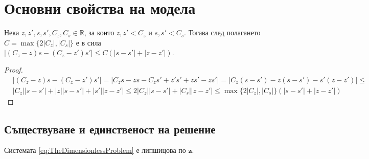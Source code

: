 \section{\hspace{1em} Основни свойства на модела}
\begin{lemma}
  \label{lemma:Modulus}
  Нека $z, z', s, s', C_z, C_s \in \mathbb{R}$, за които $z, z' < C_z$ и $s, s' < C_s$. Тогава след полагането $C = \max\{2 |C_z|, |C_s|\}$ е в сила $|(C_z - z) s - (C_z - z') s'| \leq C (|s-s'| + |z - z'|)$.
\end{lemma}

\begin{proof}
  \begin{equation}
    \begin{split}
      &|(C_z - z) s - (C_z - z') s'| =
      |C_z s - z s - C_z s' + z' s' + z s' - z s'| =
      |C_z (s - s') - z (s - s') - s' (z - z')| \leq \\
      &|C_z| |s - s'| + |z| |s - s'| + |s'| |z - z'| \leq
      2 |C_z| |s - s'|  + |C_s| |z - z'| \leq
      \max\{2 |C_z|, |C_s|\} (|s-s'| + |z - z'|)
    \end{split}
    \end{equation}
    \end{proof}
\subsection{Съществуване и единственост на решение}
\begin{proposition}
  \label{prp:LipschitzContinuity}
  Системата \eqref{eq:TheDimensionlessProblem} е липшицова по $\mathbf{z}$.
\end{proposition}

